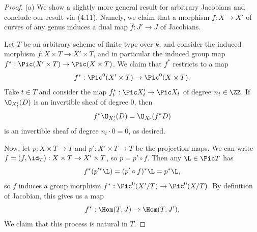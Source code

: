 \documentclass[12pt]{amsart}
\begin{document}
\begin{proof}
  (a) We show a slightly more general result for arbitrary Jacobians and conclude our result via (4.11).
  Namely, we claim that a morphism $f:X\to X'$ of curves of any genus induces a dual map $\hat f:J'\to J$ of Jacobians.

  Let $T$ be an arbitrary scheme of finite type over $k$, and consider the induced morphism $f:X\times T\to X'\times T$, and in particular the induced group map $f^*:\Pic(X'\times T)\to \Pic(X\times T)$.
  We claim that $f^*$ restricts to a map 
  \[
    f^*:\Pic^0(X'\times T)\to \Pic^0(X\times T).
  \]
  Take $t\in T$ and consider the map $f^*_t:\Pic X'_t\to \Pic X_t$ of degree $n_t\in \ZZ$.
  If $\O_{X'_t}(D)$ is an invertible sheaf of degree 0, then
  \[
    f^*\O_{X'_t}(D) = \O_{X_t}(f^*D)
  \]
  is an invertible sheaf of degree $n_t\cdot 0=0$, as desired.
  
  Now, let $p:X\times T\to T$ and $p':X'\times T\to T$ be the projection maps.
  We can write $f=(f,\id_T):X\times T\to X'\times T$, so $p=p'\circ f$.
  Then any $\L\in \Pic T$ has 
  \[
    f^*(p'^*\L) = (p'\circ f)^*\L = p^*\L,
  \]
  so $f$ induces a group morphism $f^*:\Pic^0(X'/T)\to \Pic^0(X/T)$.
  By definition of Jacobian, this gives us a map
  \[
    f^*:\Hom(T,J)\to\Hom(T,J').
  \] 
  We claim that this process is natural in $T$.


\end{proof}
\end{document}
